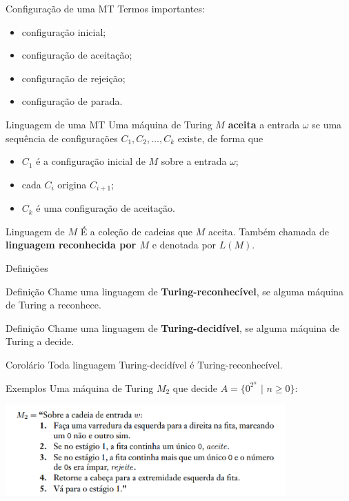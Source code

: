 \documentclass[xcolor=dvipsnames,table]{beamer}
\begin{document}
	\begin{frame}{Configuração de uma MT}
		Termos importantes:
		\begin{itemize}
			\item configuração inicial;
			\item configuração de aceitação;
			\item configuração de rejeição;
			\item configuração de parada.
		\end{itemize}
	\end{frame}
	
	\begin{frame}{Linguagem de uma MT}
		Uma máquina de Turing $M$ {\bf aceita} a entrada $\omega$ se uma sequência de configurações $C_1, C_2, \ldots, C_k$ existe, de forma que 
		\begin{itemize}
			\item $C_1$ é a configuração inicial de $M$ sobre a entrada $\omega$;
			\item cada $C_i$ origina $C_{i+1}$;
			\item $C_k$ é uma configuração de aceitação.
		\end{itemize}  
		
		\begin{block}{Linguagem de $M$}
			É a coleção de cadeias que $M$ aceita. Também chamada de {\bf linguagem reconhecida por $M$} e denotada por $L(M)$.
		\end{block}		
	\end{frame}
	
	\begin{frame}{Definições}
	\begin{block}{Definição}
		Chame uma linguagem de {\bf Turing-reconhecível}, se alguma máquina de Turing a reconhece.
	\end{block}  
	\begin{block}{Definição}
		Chame uma linguagem de {\bf Turing-decidível}, se alguma máquina de Turing a decide.
	\end{block} 
	\begin{block}{Corolário}
		Toda linguagem Turing-decidível é Turing-reconhecível.
	\end{block}
\end{frame}		

\begin{frame}{Exemplos}
Uma máquina de Turing $M_2$ que decide $A = \{ 0^{2^n}$ $|$ $n \geq 0 \}$:  
\begin{center}
\includegraphics[height=3.5cm]{images/m2.png}
\end{center}
\end{frame}
\end{document}
